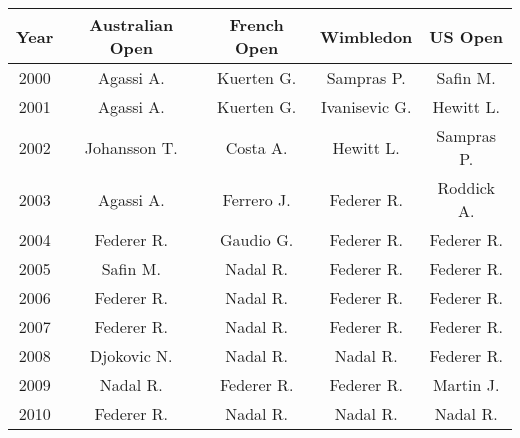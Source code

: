 \begin{table}[ht]
\centering
\begin{tabular}{|c|c|c|c|c|}
\hline
\textbf{Year} & \textbf{Australian Open}            & \textbf{French Open}                & \textbf{Wimbledon}                  & \textbf{US Open}                    \\ \hline
2000          & Agassi A.                           & Kuerten G.                          & Sampras P.                          & Safin M.                            \\ \hline
2001          & Agassi A.                           & Kuerten G.                          & Ivanisevic G.                       & Hewitt L.                           \\ \hline
2002          & Johansson T.                        & Costa A.                            & Hewitt L.                           & Sampras P.                          \\ \hline
2003          & Agassi A.                           & Ferrero J.                          & \cellcolor[HTML]{FFDDB3}Federer R.  & Roddick A.                          \\ \hline
2004          & \cellcolor[HTML]{FFDDB3}Federer R.  & Gaudio G.                           & \cellcolor[HTML]{FFDDB3}Federer R.  & \cellcolor[HTML]{FFDDB3}Federer R.  \\ \hline
2005          & Safin M.                            & \cellcolor[HTML]{B4FFB4}Nadal R.    & \cellcolor[HTML]{FFDDB3}Federer R.  & \cellcolor[HTML]{FFDDB3}Federer R.  \\ \hline
2006          & \cellcolor[HTML]{FFDDB3}Federer R.  & \cellcolor[HTML]{B4FFB4}Nadal R.    & \cellcolor[HTML]{FFDDB3}Federer R.  & \cellcolor[HTML]{FFDDB3}Federer R.  \\ \hline
2007          & \cellcolor[HTML]{FFDDB3}Federer R.  & \cellcolor[HTML]{B4FFB4}Nadal R.    & \cellcolor[HTML]{FFDDB3}Federer R.  & \cellcolor[HTML]{FFDDB3}Federer R.  \\ \hline
2008          & \cellcolor[HTML]{CBCEFB}Djokovic N. & \cellcolor[HTML]{B4FFB4}Nadal R.    & \cellcolor[HTML]{B4FFB4}Nadal R.    & \cellcolor[HTML]{FFDDB3}Federer R.  \\ \hline
2009          & \cellcolor[HTML]{B4FFB4}Nadal R.    & \cellcolor[HTML]{FFDDB3}Federer R.  & \cellcolor[HTML]{FFDDB3}Federer R.  & Martin J.                           \\ \hline
2010          & \cellcolor[HTML]{FFDDB3}Federer R.  & \cellcolor[HTML]{B4FFB4}Nadal R.    & \cellcolor[HTML]{B4FFB4}Nadal R.    & \cellcolor[HTML]{B4FFB4}Nadal R.    \\ \hline

\end{tabular}
\end{table}
